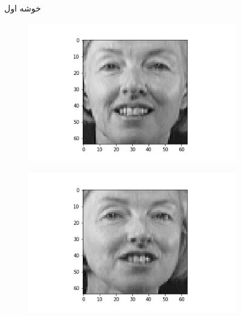 \documentclass[12pt, a4paper]{article}
\begin{document}
\begin{figure}[h]
\begin{subfigure}{0.3\linewidth}
    \end{subfigure}
    \caption{خوشه اول}
\end{figure}

\begin{figure}[h]
    \begin{subfigure}{0.3\linewidth}
        \centering
        \includegraphics[width=\linewidth]{images/q3/c/1/0.png}
    \end{subfigure}
    \hfill
    \begin{subfigure}{0.3\linewidth}
        \centering
        \includegraphics[width=\linewidth]{images/q3/c/1/1.png}
    \end{subfigure}
    \hfill
    \begin{subfigure}{0.3\linewidth}
        \centering

\end{subfigure}
\end{figure}
\end{document}
